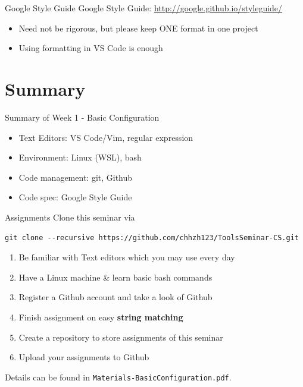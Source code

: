 \documentclass{../TexTemplate/myslide}
\begin{document}
\begin{frame}{Google Style Guide}
Google Style Guide: \url{http://google.github.io/styleguide/}
\begin{itemize}
	\item Need not be rigorous, but please keep ONE format in one project
	\item Using formatting in VS Code is enough
\end{itemize}
\end{frame}

\section{Summary}
\begin{frame}
\sectionpage
\end{frame}

\begin{frame}{Summary of Week 1 - Basic Configuration}
\begin{itemize}
	\item Text Editors: VS Code/Vim, regular expression
	\item Environment: Linux (WSL), bash
	\item Code management: git, Github
	\item Code spec: Google Style Guide
\end{itemize}
\end{frame}

\begin{frame}[fragile]{Assignments}
Clone this seminar via
\begin{flushleft}
\scriptsize \verb'git clone --recursive https://github.com/chhzh123/ToolsSeminar-CS.git'
\end{flushleft}
\begin{enumerate}
	\item Be familiar with Text editors which you may use every day
	\item Have a Linux machine \& learn basic bash commands
	\item Register a Github account and take a look of Github
	\item Finish assignment on easy \textbf{string matching}
	\item Create a repository to store assignments of this seminar
	\item Upload your assignments to Github
\end{enumerate}
Details can be found in \verb'Materials-BasicConfiguration.pdf'.
\end{frame}
\end{document}
